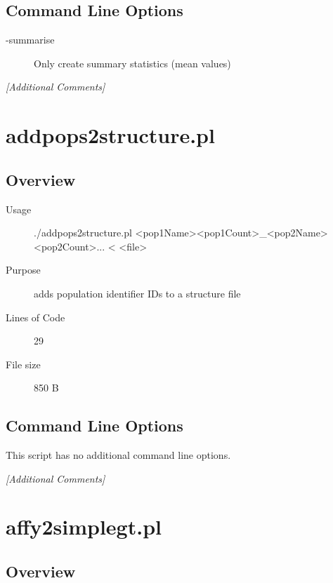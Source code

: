 \subsection{Command Line Options}
\label{sec:9-predictive-power.pl-command-line}

\begin{description}
\item[-summarise] Only create summary statistics (mean values)
\end{description}

\emph{[Additional Comments]}

\section{addpops2structure.pl}
\label{sec:addpops2structure.pl}

\subsection{Overview}
\label{sec:addpops2structure.pl-overview}

\begin{description}
\item[Usage] ./addpops2structure.pl <pop1Name><pop1Count>_<pop2Name><pop2Count>... < <file>
\item[Purpose] adds population identifier IDs to a structure file
\item[Lines of Code] 29
\item[File size] 850 B
\end{description}

\subsection{Command Line Options}
\label{sec:addpops2structure.pl-command-line}

This script has no additional command line options.

\emph{[Additional Comments]}

\section{affy2simplegt.pl}
\label{sec:affy2simplegt.pl}

\subsection{Overview}
\label{sec:affy2simplegt.pl-overview}

